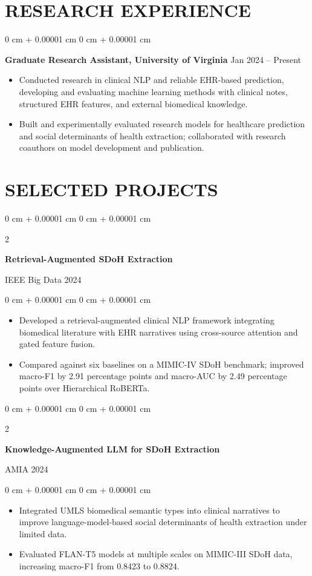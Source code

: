 \documentclass[10pt, letterpaper]{article}
\newenvironment{highlights}{
    \begin{itemize}[
        topsep=0.03 cm,
        parsep=0.03 cm,
        partopsep=0pt,
        itemsep=0pt,
        leftmargin=0 cm + 10pt
    ]
}{
    \end{itemize}
} %
\newenvironment{onecolentry}{
    \begin{adjustwidth}{
        0 cm + 0.00001 cm
    }{
        0 cm + 0.00001 cm
    }
}{
    \end{adjustwidth}
} %
\newenvironment{twocolentry}[2][]{
    \onecolentry
    \def\secondColumn{#2}
    \setcolumnwidth{\fill, 4.5 cm}
    \begin{paracol}{2}
}{
    \switchcolumn \raggedleft \secondColumn
    \end{paracol}
    \endonecolentry
} %
\begin{document}
\section{RESEARCH EXPERIENCE}
\begin{onecolentry}
\textbf{Graduate Research Assistant, University of Virginia} \hfill Jan 2024 -- Present
\begin{highlights}
\item Conducted research in clinical NLP and reliable EHR-based prediction, developing and evaluating machine learning methods with clinical notes, structured EHR features, and external biomedical knowledge.
\item Built and experimentally evaluated research models for healthcare prediction and social determinants of health extraction; collaborated with research coauthors on model development and publication.
\end{highlights}
\end{onecolentry}
\section{SELECTED PROJECTS}

\begin{twocolentry}{IEEE Big Data 2024}
\textbf{Retrieval-Augmented SDoH Extraction}
\end{twocolentry}
\begin{onecolentry}
\begin{highlights}
\item Developed a retrieval-augmented clinical NLP framework integrating biomedical literature with EHR narratives using cross-source attention and gated feature fusion.
\item Compared against six baselines on a MIMIC-IV SDoH benchmark; improved macro-F1 by 2.91 percentage points and macro-AUC by 2.49 percentage points over Hierarchical RoBERTa.
\end{highlights}
\end{onecolentry}
\vspace{0.06 cm}

\begin{twocolentry}{AMIA 2024}
\textbf{Knowledge-Augmented LLM for SDoH Extraction}
\end{twocolentry}
\begin{onecolentry}
\begin{highlights}
\item Integrated UMLS biomedical semantic types into clinical narratives to improve language-model-based social determinants of health extraction under limited data.
\item Evaluated FLAN-T5 models at multiple scales on MIMIC-III SDoH data, increasing macro-F1 from 0.8423 to 0.8824.
\end{highlights}
\end{onecolentry}
\vspace{0.06 cm}
\end{document}
